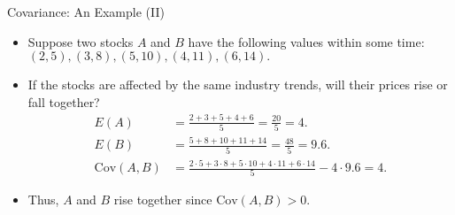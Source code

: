 \begin{frame}{Covariance: An Example (II)}
	\begin{itemize}
		\item Suppose two stocks $A$ and $B$ have the following values within 
		some time:\\
		$(2,5), (3,8), (5,10), (4,11), (6,14).$
		\item If the stocks are affected by the same industry trends, will 
		their prices rise or fall together?
		\begin{align}
			E(A)            & = \frac{2+3+5+4+6}{5} = \frac{20}{5} = 
			4.                                               \\
			E(B)            & = \frac{5+8+10+11+14}{5} = \frac{48}{5} = 
			9.6.                                          \\
			\text{Cov}(A,B) & = \frac{2\cdot5 + 3\cdot 8 + 5 \cdot 10 + 4 \cdot 
			11 + 6 \cdot 14}{5} - 4\cdot 9.6 = 4. 
		\end{align}
		\item Thus, $A$ and $B$ rise together since $\text{Cov}(A,B) > 0$.
	\end{itemize}
\end{frame}